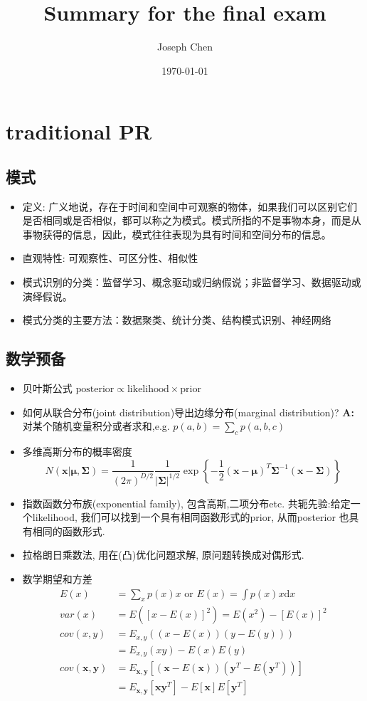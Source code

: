 \documentclass[12pt,letterpaper]{article}
\author{Joseph  Chen}
\title{Summary for the final exam}
\date{\today}
\begin{document}
	\maketitle
	
\section{traditional PR}
\subsection{模式}
\begin{itemize}
	\item 定义: 广义地说，存在于时间和空间中可观察的物体，如果我们可以区别它们是否相同或是否相似，都可以称之为模式。模式所指的不是事物本身，而是从事物获得的信息，因此，模式往往表现为具有时间和空间分布的信息。
	\item 直观特性: 可观察性、可区分性、相似性
	\item 模式识别的分类：监督学习、概念驱动或归纳假说；非监督学习、数据驱动或演绎假说。
	\item  模式分类的主要方法：数据聚类、统计分类、结构模式识别、神经网络	
\end{itemize}
\subsection{数学预备}
\begin{itemize}
	\item 贝叶斯公式  $\text{posterior} \propto \text{likelihood}\times  \text{prior} $ 
	\item 如何从联合分布(joint distribution)导出边缘分布(marginal distribution)?  \textbf{A: } 对某个随机变量积分或者求和,e.g. 
	$p(a,b) = \sum_{c}p(a,b,c)$
	\item 多维高斯分布的概率密度
	\[
		N(\bm{x}|\bm{\mu}, \bm{\Sigma}) = \frac{1}{(2\pi)^{D/2} }\frac{1}{ |\bm{\Sigma}|^{1/2}} \exp\left\{
			-\frac{1}{2} (\bm{x} - \bm{\mu})^T \bm{\Sigma}^{-1} (\bm{x} - \bm{\Sigma})
			\right\}
	\]
	\item 指数函数分布族(exponential family), 包含高斯,二项分布etc. 共轭先验:给定一个likelihood,  我们可以找到一个具有相同函数形式的prior, 从而posterior 也具有相同的函数形式.
	\item 拉格朗日乘数法, 用在(凸)优化问题求解, 原问题转换成对偶形式.
	\item 数学期望和方差 
	\[
		 \begin{split} 
			E(x) &= \sum_{x} p(x)x \text{ or } E(x) = \int p(x)x \mathrm{d}x \\
			var(x) &= E( [x - E(x)]^2 ) = E(x^2) - [E(x)]^2 \\
			cov(x, y ) &= E_{x,y}( (x-E(x))(y-E(y))  ) \\
			&= E_{x,y}(xy) - E(x)E(y) \\
			cov(\bm{x},\bm{y}) &= E_{\bm{x},\bm{y}}
			[
			 (\bm{x} - E(\bm{x})) (\bm{y}^T - E(\bm{y}^T))
			] \\
			&= E_{\bm{x},\bm{y}}[\bm{x}\bm{y}^T ] - E[\bm{x}]E[\bm{y}^T]
		\end{split} 
	\]
\end{itemize}
\end{document}
